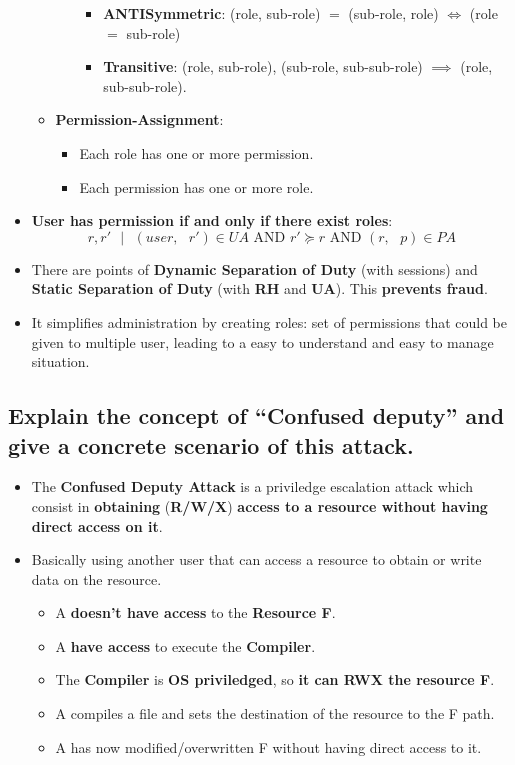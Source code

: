 \documentclass[9pt, letterpaper]{article}
\begin{document}
\begin{itemize}
\begin{itemize}
\begin{itemize}
\begin{itemize}
				\item \textbf{ANTISymmetric}: (role, sub-role) $=$ (sub-role, role) $\iff$ (role $=$ sub-role)
				\item \textbf{Transitive}: (role, sub-role), (sub-role, sub-sub-role) $\implies$ (role, sub-sub-role).
			\end{itemize}
		\end{itemize}
		\item \textbf{Permission-Assignment}:
		\begin{itemize}
			\item Each role has one or more permission.
			\item Each permission has one or more role.
		\end{itemize}
	\end{itemize}
	\item \textbf{User has permission if and only if there exist roles}: $$r,r' \mbox{ } | \mbox{ } (user,\mbox{ }r')\in UA  \mbox{ AND } r'\succeq r \mbox{ AND } (r,\mbox{ }p)\in PA$$
	\item There are points of \textbf{Dynamic Separation of Duty} (with sessions) and \textbf{Static Separation of Duty} (with \textbf{RH} and \textbf{UA}). This \textbf{prevents fraud}.
	\item It simplifies administration by creating roles: set of permissions that could be given to multiple user, leading to a easy to understand and easy to manage situation.
\end{itemize}

\subsection{Explain the concept of “Confused deputy” and give a concrete scenario of this attack.}
\begin{itemize}
	\item The \textbf{Confused Deputy Attack} is a priviledge escalation attack which consist in \textbf{obtaining} (\textbf{R/W/X}) \textbf{access to a resource without having direct access on it}.
	\item Basically using another user that can access a resource to obtain or write data on the resource.
	\begin{itemize}
		\item A \textbf{doesn't have access} to the \textbf{Resource F}.
		\item A \textbf{have access} to execute the \textbf{Compiler}.
		\item The \textbf{Compiler} is \textbf{OS priviledged}, so \textbf{it can RWX the resource F}.
		\item A compiles a file and sets the destination of the resource to the F path.
		\item A has now modified/overwritten F without having direct access to it.
	\end{itemize}
\end{itemize}
\end{document}
